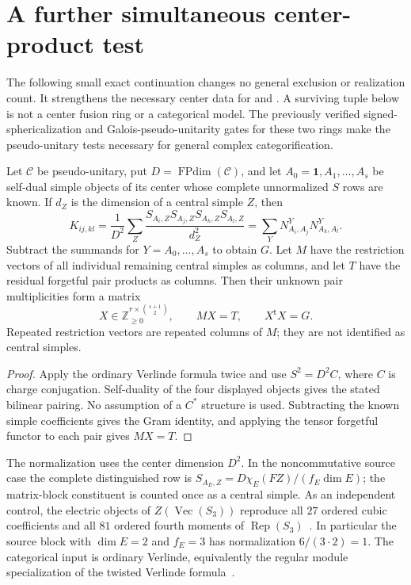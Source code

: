 \section{A further simultaneous center-product test}
\label{sec:center-product-followup}

The following small exact continuation changes no general exclusion or
realization count.  It strengthens the necessary center data for
 and .  A surviving tuple below
is not a center fusion ring or a categorical model.  The previously
verified signed-sphericalization and Galois-pseudo-unitarity gates for
these two rings make the pseudo-unitary tests necessary for general
complex categorification.

\begin{lemma}
\label{lem:followup-pair-gram}
Let $\mathcal C$ be pseudo-unitary, put $D=\operatorname{FPdim}(\mathcal C)$,
and let $A_0=\mathbf1,A_1,\ldots,A_s$ be self-dual simple objects of its
center whose complete unnormalized $S$ rows are known.  If $d_Z$ is the
dimension of a central simple $Z$, then
\[
 K_{ij,kl}=\frac1{D^2}\sum_Z
 \frac{S_{A_i,Z}S_{A_j,Z}S_{A_k,Z}S_{A_l,Z}}{d_Z^2}
 =\sum_Y N_{A_i,A_j}^{Y}N_{A_k,A_l}^{Y}.
\]
Subtract the summands for $Y=A_0,\ldots,A_s$ to obtain $G$.
Let $M$ have the restriction vectors of all individual remaining central
simples as columns, and let $T$ have the residual forgetful pair products
as columns.  Then their unknown pair multiplicities form a matrix
\[
             X\in\mathbb Z_{\ge0}^{r\times\binom{s+1}{2}},
             \qquad MX=T,\qquad X^{\mathsf t}X=G.
\]
Repeated restriction vectors are repeated columns of $M$; they are not
identified as central simples.
\end{lemma}

\begin{proof}
Apply the ordinary Verlinde formula twice and use
$S^2=D^2C$, where $C$ is charge conjugation.  Self-duality of the four
displayed objects gives the stated bilinear pairing.  No assumption
of a $C^*$ structure is used.  Subtracting the known simple coefficients
gives the Gram identity, and applying the tensor forgetful functor to
each pair gives $MX=T$.
\end{proof}

The normalization uses the center dimension $D^2$.  In the
noncommutative source case the complete distinguished row is
$S_{A_E,Z}=D\chi_E(FZ)/(f_E\dim E)$; the matrix-block constituent is
counted once as a central simple.  As an independent control, the
electric objects of $Z(\operatorname{Vec}(S_3))$ reproduce all $27$
ordered cubic coefficients and all $81$ ordered fourth moments of
$\operatorname{Rep}(S_3)$~\cite[Section~2.2]{CosteGannonRuelleFollowup}.  In particular the source block with
$\dim E=2$ and $f_E=3$ has normalization $6/(3\cdot2)=1$.
The categorical input is ordinary Verlinde, equivalently the regular
module specialization of the twisted Verlinde formula~\cite[Theorem~1.1]{DeshpandeVerlindeFollowup}.

